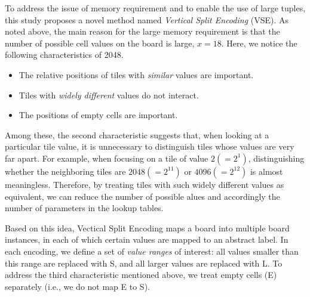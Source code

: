 
To address the issue of memory requirement and to enable the use of large tuples, this study proposes a novel method named \emph{Vertical Split Encoding} (VSE).
As noted above, the main reason for the large memory requirement is that the number of possible cell values on the board is large, $x = 18$.
Here, we notice the following characteristics of 2048.
\begin{itemize}
 \item The relative positions of tiles with \emph{similar} values are important.
 \item Tiles with \emph{widely different} values do not interact.
 \item The positions of empty cells are important.
\end{itemize}
Among these, the second characteristic suggests that, when looking at a particular tile value, it is unnecessary to distinguish tiles whose values are very far apart. For example, when focusing on a tile of value $2 (=2^1)$, distinguishing whether the neighboring tiles are $2048 (=2^{11})$ or $4096 (=2^{12})$ is almost meaningless.
Therefore, by treating tiles with such widely different values as equivalent, we can reduce the number of possible alues and accordingly the number of parameters in the lookup tables.

Based on this idea, Vectical Split Encoding maps a board into multiple board instances, in each of which certain values are mapped to an abstract label.
In each encoding, we define a set of \emph{value ranges} of interest: all values smaller than this range are replaced with S, and all larger values are replaced with L.
To address the third characteristic mentioned above, we treat empty cells (E) separately (i.e., we do not map E to S).

